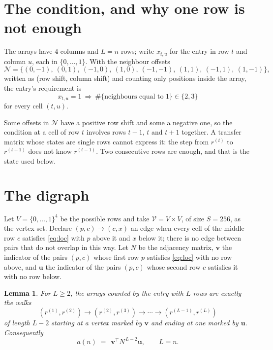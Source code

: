 \documentclass[11pt,a4paper]{article}
\theoremstyle{plain}
\newtheorem{lemma}[theorem]{Lemma}
\theoremstyle{definition}
\begin{document}
\section{The condition, and why one row is not enough}

The arrays have $4$ columns and $L=n$ rows; write $x_{t,u}$ for the entry in
row $t$ and column $u$, each in $\{0,\dots,1\}$. With the neighbour offsets
\[
\mathcal N=\{(0,-1),\ (0,1),\ (-1,0),\ (1,0),\ (-1,-1),\ (1,1),\ (-1,1),\ (1,-1)\},
\]
written as (row shift, column shift) and counting only positions inside the array, the
entry's requirement is
\begin{equation}\label{eq:loc}
x_{t,u}=1\ \Rightarrow\ \#\{\text{neighbours equal to }1\}\in\{2,3\}
\end{equation}
for every cell $(t,u)$.

Some offsets in $\mathcal N$ have a positive row shift and some a negative one, so the
condition at a cell of row $t$ involves rows $t-1$, $t$ and $t+1$ together. A transfer
matrix whose states are single rows cannot express it: the step from $r^{(t)}$ to
$r^{(t+1)}$ does not know $r^{(t-1)}$. Two consecutive rows are enough, and that is
the state used below.

\section{The digraph}

Let $V=\{0,\dots,1\}^{4}$ be the possible rows and take
$\mathcal V=V\times V$, of size $S=256$, as the vertex set. Declare $(p,c)\to(c,x)$ an edge
when every cell of the middle row $c$ satisfies \eqref{eq:loc} with $p$ above it and $x$
below it; there is no edge between pairs that do not overlap in this way. Let $N$ be the
adjacency matrix, $\mathbf{v}$ the indicator of the pairs $(p,c)$ whose first row $p$
satisfies \eqref{eq:loc} with no row above, and $\mathbf{u}$ the indicator of
the pairs $(p,c)$ whose second row $c$ satisfies it with no row below.

\begin{lemma}\label{lem:walk}
For $L\ge2$, the arrays counted by the entry with $L$ rows are exactly the walks
\[
(r^{(1)},r^{(2)})\to(r^{(2)},r^{(3)})\to\cdots\to(r^{(L-1)},r^{(L)})
\]
of length $L-2$ starting at a vertex marked by $\mathbf{v}$ and ending at one marked by
$\mathbf{u}$. Consequently
\[
a(n)\;=\;\,\mathbf{v}^{\!\top}N^{\,L-2}\mathbf{u},\qquad L=n .
\]
\end{lemma}
\end{document}
